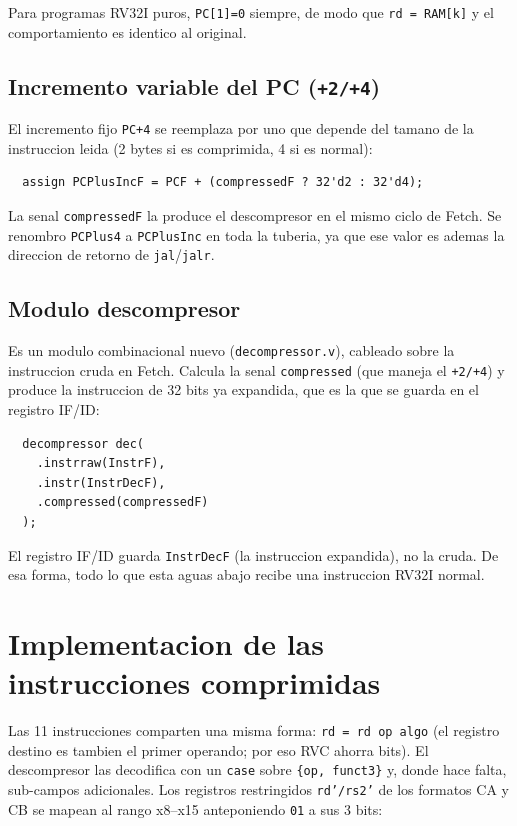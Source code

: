 \documentclass[11pt,a4paper]{article}
\begin{document}
Para programas RV32I puros, \texttt{PC[1]=0} siempre, de modo que
\texttt{rd = RAM[k]} y el comportamiento es identico al original.

\subsection{Incremento variable del PC (\texttt{+2/+4})}

El incremento fijo \texttt{PC+4} se reemplaza por uno que depende del tamano de la
instruccion leida (2 bytes si es comprimida, 4 si es normal):

\begin{lstlisting}
  assign PCPlusIncF = PCF + (compressedF ? 32'd2 : 32'd4);
\end{lstlisting}

La senal \texttt{compressedF} la produce el descompresor en el mismo ciclo de
Fetch. Se renombro \texttt{PCPlus4} a \texttt{PCPlusInc} en toda la tuberia, ya
que ese valor es ademas la direccion de retorno de \texttt{jal}/\texttt{jalr}.

\subsection{Modulo descompresor}

Es un modulo combinacional nuevo (\texttt{decompressor.v}), cableado sobre la
instruccion cruda en Fetch. Calcula la senal \texttt{compressed} (que maneja el
\texttt{+2/+4}) y produce la instruccion de 32 bits ya expandida, que es la que se
guarda en el registro IF/ID:

\begin{lstlisting}
  decompressor dec(
    .instrraw(InstrF),
    .instr(InstrDecF),
    .compressed(compressedF)
  );
\end{lstlisting}

El registro IF/ID guarda \texttt{InstrDecF} (la instruccion expandida), no la
cruda. De esa forma, todo lo que esta aguas abajo recibe una instruccion RV32I
normal.

\section{Implementacion de las instrucciones comprimidas}

Las 11 instrucciones comparten una misma forma: \texttt{rd = rd op algo} (el
registro destino es tambien el primer operando; por eso RVC ahorra bits). El
descompresor las decodifica con un \texttt{case} sobre \texttt{\{op, funct3\}} y,
donde hace falta, sub-campos adicionales. Los registros restringidos
\texttt{rd'/rs2'} de los formatos CA y CB se mapean al rango x8--x15 anteponiendo
\texttt{01} a sus 3 bits:
\end{document}
